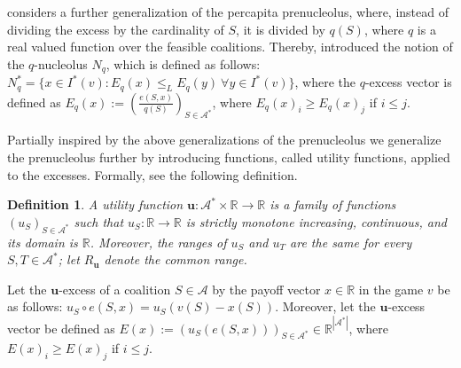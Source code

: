 \documentclass[a4paper,12pt]{article}
\newtheorem{definition}[theorem]{Definition}
\theoremstyle{definition}
\theoremstyle{remark}
\begin{document}
\cite{Solymosi2019} considers a further generalization of the percapita prenucleolus, where, instead of dividing the excess by the cardinality of $S$, it is divided by $q(S)$, where $q$ is a real valued function over the feasible coalitions. Thereby, \cite{Solymosi2019} introduced the notion of the $q$-nucleolus $N_q$, which is defined as follows: $N^\ast_{q} = \{ x\in I^*(v) \colon E_{q} (x) \leq _L E_{q} (y) \ \forall y\in I^*(v)\}$, where the $q$-excess vector is defined as $E_{q} (x) := (\frac{e (S,x)}{q(S)})_{S \in \mathcal{A}^\ast}$, where $E_q (x)_i \geq E_q (x)_j$  if $i \leq j$.

Partially inspired by the above generalizations of the prenucleolus we generalize the prenucleolus further by introducing functions, called utility functions, applied to the excesses. Formally, see the following definition. %

\begin{definition}\label{def:uf}
A utility function $\mathbf{u} \colon \mathcal{A}^\ast \times \mathbb{R} \to \mathbb{R}$ is a family of functions $(u_S)_{S\in \mathcal{A}^\ast}$ such that $u_S \colon \mathbb{R} \to \mathbb{R}$ is strictly monotone increasing, continuous, and its domain is $\mathbb{R}$. Moreover, the ranges of $u_S$ and $u_T$ are the same for every $S, T \in \mathcal{A}^\ast$; let $R_{\mathbf{u}}$ denote the common range.
\end{definition}

Let the $\mathbf{u}$-excess of a coalition $S\in \mathcal{A}$ by the payoff vector $x\in \mathbb{R}$ in the game $v$ be as follows: $u_S \circ e(S, x) = u_S (v(S)-x(S))$. Moreover, let the $\mathbf{u}$-excess vector be defined as $E(x) := (u_S (e (S,x)))_{S \in \mathcal{A}^\ast} \in \mathbb{R}^{|\mathcal{A}^\ast|}$, where $E (x)_i \geq E(x)_j$ if $i \leq j$.

\end{document}
